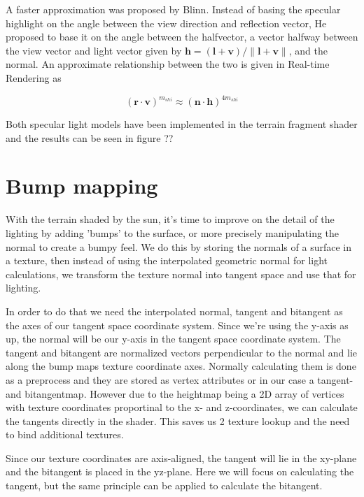 A faster approximation was proposed by Blinn. Instead of basing the
specular highlight on the angle between the view direction and
reflection vector, He proposed to base it on the angle between the
halfvector, a vector halfway between the view vector and light vector
given by $\mathbf{h} = (\mathbf{l} + \mathbf{v}) / \|\mathbf{l} +
\mathbf{v}\|$, and the normal. An approximate relationship between the
two is given in Real-time Rendering as

\begin{displaymath}
  (\mathbf{r} \cdot \mathbf{v})^{m_{shi}} \approx (\mathbf{n} \cdot \mathbf{h})^{4m_{shi}} 
\end{displaymath}

Both specular light models have been implemented in the terrain
fragment shader and the results can be seen in figure ??



\section{Bump mapping}

With the terrain shaded by the sun, it's time to improve on the detail
of the lighting by adding 'bumps' to the surface, or more precisely
manipulating the normal to create a bumpy feel. We do this by storing
the normals of a surface in a texture, then instead of using the
interpolated geometric normal for light calculations, we transform the
texture normal into tangent space and use that for lighting.

In order to do that we need the interpolated normal, tangent and
bitangent as the axes of our tangent space coordinate system. Since
we're using the y-axis as up, the normal will be our y-axis in the
tangent space coordinate system. The tangent and bitangent are
normalized vectors perpendicular to the normal and lie along the bump
maps texture coordinate axes. Normally calculating them is done as a
preprocess and they are stored as vertex attributes or in our case a
tangent- and bitangentmap. However due to the heightmap being a 2D
array of vertices with texture coordinates proportinal to the x- and
z-coordinates, we can calculate the tangents directly in the
shader. This saves us 2 texture lookup and the need to bind additional
textures.

Since our texture coordinates are axis-aligned, the tangent will lie
in the xy-plane and the bitangent is placed in the yz-plane. Here we
will focus on calculating the tangent, but the same principle can be
applied to calculate the bitangent.

